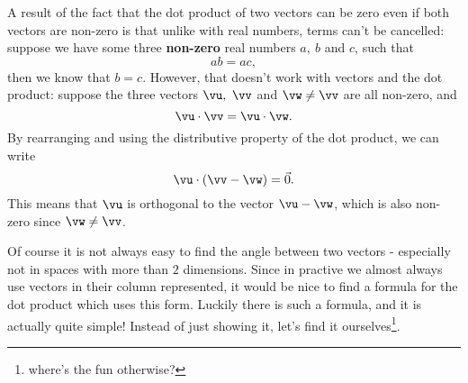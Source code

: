 \begin{figure}[H]
	\centering
\end{figure}


A result of the fact that the dot product of two vectors can be zero even if both vectors are non-zero is that unlike with real numbers, terms can't be cancelled: suppose we have some three \textbf{non-zero} real numbers $a,\ b$ and $c$, such that
\[
  ab = ac,
\]
then we know that $b=c$. However, that doesn't work with vectors and the dot product: suppose the three vectors $\vu,\ \vv$ and $\vw\neq\vv$ are all non-zero, and
\[
  \vu\cdot\vv = \vu\cdot\vw.
\]
By rearranging and using the distributive property of the dot product, we can write
\[
  \vu\cdot(\vv-\vw) = \vec{0}.
\]
This means that $\vu$ is orthogonal to the vector $\vu-\vw$, which is also non-zero since $\vw\neq\vv$.

Of course it is not always easy to find the angle between two vectors - especially not in spaces with more than $2$ dimensions. Since in practive we almost always use vectors in their column represented, it would be nice to find a formula for the dot product which uses this form. Luckily there is such a formula, and it is actually quite simple! Instead of just showing it, let's find it ourselves\footnote{where's the fun otherwise?}.

